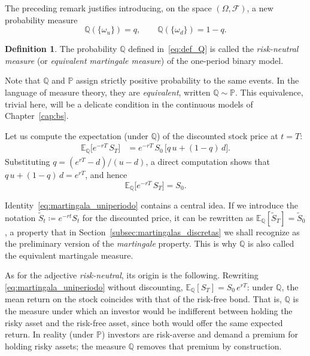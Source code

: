 \documentclass[11pt,a4paper,oneside]{report}
\theoremstyle{plain}
\theoremstyle{definition}
\newtheorem{definicion}[teorema]{Definition}
\theoremstyle{remark}
\newcommand{\E}{\mathbb{E}}
\newcommand{\PP}{\mathbb{P}}
\newcommand{\Q}{\mathbb{Q}}
\newcommand{\F}{\mathcal{F}}
\newcommand{\1}{\mathbf{1}}
\newcommand{\eqdef}{\coloneqq}
\begin{document}
The
preceding remark justifies introducing, on the space $(\Omega, \F)$,
a new probability measure
\begin{equation}\label{eq:def_Q}
  \Q(\{\omega_u\}) = q, \qquad \Q(\{\omega_d\}) = 1 - q.
\end{equation}

\begin{definicion}
\label{def:medida_riesgo}
The probability $\Q$ defined in~\eqref{eq:def_Q} is called the
\emph{risk-neutral measure} (or \emph{equivalent martingale measure})
of the one-period binary model.
\end{definicion}

Note that $\Q$ and $\PP$ assign strictly positive probability to the
same events. In the language of measure theory, they are
\emph{equivalent}, written $\Q \sim \PP$. This equivalence, trivial
here, will be a delicate condition in the continuous models of
Chapter~\ref{cap:bs}.

Let us compute
the expectation (under $\Q$) of the discounted stock price at
$t = T$:
\begin{align*}
  \E_{\Q}\bigl[e^{-rT}\, S_T\bigr]
  &= e^{-rT}\, S_0\,\bigl[q\, u + (1 - q)\, d\bigr].
\end{align*}
Substituting $q = (e^{rT} - d)/(u - d)$, a direct computation shows
that $q\, u + (1 - q)\, d = e^{rT}$, and hence
\begin{equation}\label{eq:martingala_uniperiodo}
  \E_{\Q}\bigl[e^{-rT}\, S_T\bigr] = S_0.
\end{equation}

Identity~\eqref{eq:martingala_uniperiodo} contains a central idea. If
we introduce the notation $\widetilde S_t \eqdef e^{-rt} S_t$ for the
discounted price, it can be rewritten as
$\E_{\Q}[\widetilde S_T] = \widetilde S_0$, a property that in
Section~\ref{subsec:martingalas_discretas} we shall recognize as the
preliminary version of the \emph{martingale} property. This is why
$\Q$ is also called the equivalent martingale measure.

As for the adjective \emph{risk-neutral}, its origin is the following.
Rewriting \eqref{eq:martingala_uniperiodo} without discounting,
$\E_\Q[S_T] = S_0\, e^{rT}$: under $\Q$, the mean return on the stock
coincides with that of the risk-free bond. That is, $\Q$ is the
measure under which an investor would be indifferent between holding
the risky asset and the risk-free asset, since both would offer the
same expected return. In reality (under $\PP$) investors are
risk-averse and demand a premium for holding risky assets; the measure
$\Q$ removes that premium by construction.
\end{document}
